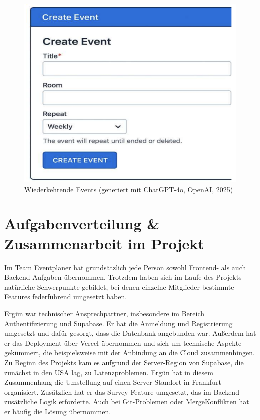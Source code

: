 \documentclass[a4paper,12pt]{article}
\begin{document}
\begin{figure}[H]
    \centering
    \includegraphics[width=1\textwidth]{Abbildungen/wiederkehrende_events.png}
    \caption{Wiederkehrende Events (generiert mit ChatGPT-4o, OpenAI, 2025)}
    \label{fig:wiederkehrende_events}
\end{figure}

\newpage


\section{Aufgabenverteilung \& Zusammenarbeit im Projekt}

Im Team Eventplaner hat grundsätzlich jede Person sowohl Frontend- als auch Backend-Aufgaben übernommen. Trotzdem haben sich im Laufe des Projekts natürliche Schwerpunkte gebildet, bei denen einzelne Mitglieder bestimmte Features federführend umgesetzt haben. 

Ergün war technischer Ansprechpartner, insbesondere im Bereich Authentifizierung und Supabase. Er hat die Anmeldung und Registrierung umgesetzt und dafür gesorgt, dass die Datenbank angebunden war. Außerdem hat er das \gls{Deployment} über \gls{Vercel} übernommen und sich um technische Aspekte gekümmert, die beispielsweise mit der Anbindung an die Cloud zusammenhingen. Zu Beginn des Projekts kam es aufgrund der Server-Region von Supabase, die zunächst in den USA lag, zu Latenzproblemen. Ergün hat in diesem Zusammenhang die Umstellung auf einen Server-Standort in Frankfurt organisiert. Zusätzlich hat er das Survey-Feature umgesetzt, das im Backend zusätzliche Logik erforderte. Auch bei Git-Problemen oder MergeKonflikten hat er häufig die Lösung übernommen.
\end{document}
